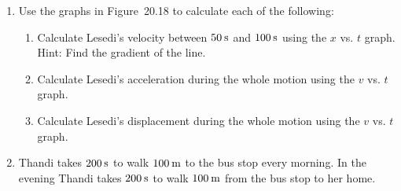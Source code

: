         \label{m38795*id71023}\begin{enumerate}[noitemsep, label=\textbf{\arabic*}. ] 
            \label{m38795*uid94}\item Use the graphs in Figure~20.18 to calculate each of the following:
\label{m38795*id71044}\begin{enumerate}[noitemsep, label=\textbf{\alph*}. ] 
            \label{m38795*uid95}\item Calculate Lesedi's velocity between \begin{math}50\phantom{\rule{2pt}{0ex}}\mathrm{s}\end{math} and \begin{math}100\phantom{\rule{2pt}{0ex}}\mathrm{s}\end{math} using the \begin{math}x\end{math} vs. \begin{math}t\end{math} graph. Hint: Find the gradient of the line.
\label{m38795*uid96}\item Calculate Lesedi's acceleration during the whole motion using the \begin{math}v\end{math} vs. \begin{math}t\end{math} graph.
\label{m38795*uid97}\item Calculate Lesedi's displacement during the whole motion using the \begin{math}v\end{math} vs. \begin{math}t\end{math} graph.
\end{enumerate}
                \label{m38795*uid98}\item Thandi takes \begin{math}200\phantom{\rule{2pt}{0ex}}\mathrm{s}\end{math} to walk \begin{math}100\phantom{\rule{2pt}{0ex}}\mathrm{m}\end{math} to the bus stop every morning. In the evening Thandi takes \begin{math}200\phantom{\rule{2pt}{0ex}}\mathrm{s}\end{math} to walk \begin{math}100\phantom{\rule{2pt}{0ex}}\mathrm{m}\end{math} from the bus stop to her home.\label{m38795*id7103444}\begin{enumerate}[noitemsep, label=\textbf{\alph*}. ] 

\end{enumerate}
\end{enumerate}

